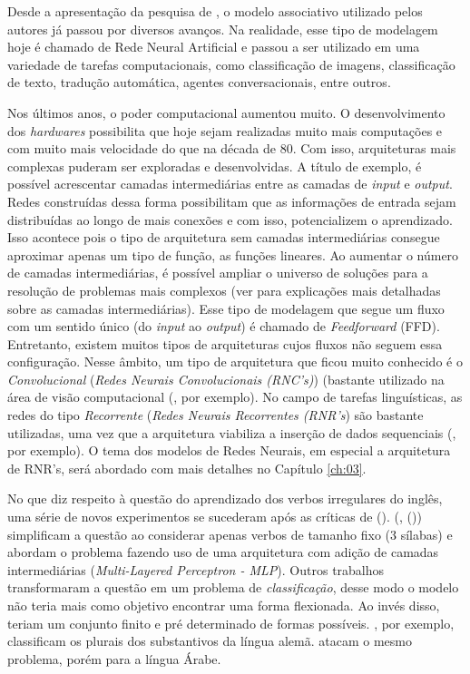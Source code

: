 Desde a apresentação da pesquisa de \cite{rumelhart:1986}, o modelo associativo utilizado pelos autores já passou por diversos avanços. Na realidade, esse tipo de modelagem hoje é chamado de Rede Neural Artificial e passou a ser utilizado em uma variedade de tarefas computacionais, como classificação de imagens, classificação de texto, tradução automática, agentes conversacionais, entre outros. 

Nos últimos anos, o poder computacional aumentou muito. O desenvolvimento dos \textit{hardwares} possibilita que hoje sejam realizadas muito mais computações e com muito mais velocidade do que na década de 80. Com isso, arquiteturas mais complexas puderam ser exploradas e desenvolvidas. A título de exemplo, é possível acrescentar camadas intermediárias entre as camadas de \textit{input} e \textit{output}. Redes construídas dessa forma possibilitam que as informações de entrada sejam distribuídas ao longo de mais conexões e com isso, potencializem o aprendizado. Isso acontece pois o tipo de arquitetura sem camadas intermediárias consegue aproximar apenas um tipo de função, as funções lineares. Ao aumentar o número de camadas intermediárias, é possível ampliar o universo de soluções para a resolução de problemas mais complexos (ver \cite{Goodfellow-et-al-2016} para explicações mais detalhadas sobre as camadas intermediárias). Esse tipo de modelagem que segue um fluxo com um sentido único (do \textit{input} ao \textit{output}) é chamado de \textit{Feedforward} (FFD). Entretanto, existem muitos tipos de arquiteturas cujos fluxos não seguem essa configuração. Nesse âmbito, um tipo de arquitetura que ficou muito conhecido é o \textit{Convolucional} (\textit{Redes Neurais Convolucionais (RNC's)}) (bastante utilizado na área de visão computacional (\cite{Krizhevsky:2012}, por exemplo). No campo de tarefas linguísticas, as redes do tipo \textit{Recorrente} (\textit{Redes Neurais Recorrentes (RNR's}) são bastante utilizadas, uma vez que a arquitetura viabiliza a inserção de dados sequenciais  (\cite{pengfei:2016}, por exemplo). O tema dos modelos de Redes Neurais, em especial a arquitetura de RNR's, será abordado com mais detalhes no Capítulo \ref{ch:03}.

No que diz respeito à questão do aprendizado dos verbos irregulares do inglês, uma série de novos experimentos se sucederam após as críticas de (\cite{Pinker:1988}). (\cite{pluket:1991}, (\citeyear{PLUNKETT:1993})) simplificam a questão ao considerar apenas verbos de tamanho fixo (3 sílabas) e abordam o problema fazendo uso de uma arquitetura com adição de camadas intermediárias (\textit{Multi-Layered Perceptron - MLP}). Outros trabalhos transformaram a questão em um problema de \textit{classificação}, desse modo o modelo não teria mais como objetivo encontrar uma forma flexionada. Ao invés disso, teriam um conjunto finito e pré determinado de formas possíveis. \cite{Nakisa1996WhereDD}, por exemplo, classificam os plurais dos substantivos da língua alemã. \cite{plunkett:1997} atacam o mesmo problema, porém para a língua Árabe.

